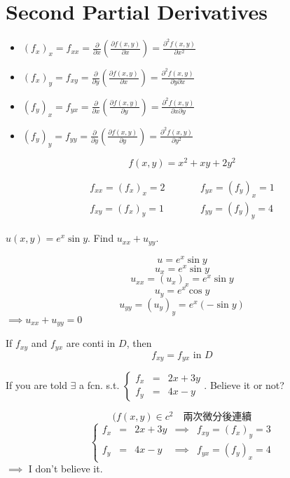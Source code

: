 \section{Second Partial Derivatives}
\begin{itemize}
\item \((f_x)_x = f_{xx} = \displaystyle \frac{\partial}{\partial x} (\frac{\partial f(x, y)}{\partial x}) = \frac{\partial^2 f(x, y)}{\partial x^2}\)
\item \((f_x)_y = f_{xy} = \displaystyle \frac{\partial}{\partial y} (\frac{\partial f(x, y)}{\partial x}) = \frac{\partial^2 f(x, y)}{\partial y \partial x}\)
\item \((f_y)_x = f_{yx} = \displaystyle \frac{\partial}{\partial x} (\frac{\partial f(x, y)}{\partial y}) = \frac{\partial^2 f(x, y)}{\partial x \partial y}\)
\item \((f_y)_y = f_{yy} = \displaystyle \frac{\partial}{\partial y} (\frac{\partial f(x, y)}{\partial y}) = \frac{\partial^2 f(x, y)}{\partial y^2}\)
\end{itemize}
\begin{eg}
\[f(x, y) = x^2 + xy + 2y^2\]

\[\begin{array}{rcl}
f_{xx} = (f_x)_x = 2 & \quad \quad & f_{yx} = (f_y)_x = 1\\
f_{xy} = (f_x)_y = 1 & \quad \quad & f_{yy} = (f_y)_y = 4
\end{array}\]
\end{eg}
\begin{eg}
\(u(x, y) = e^x \sin y\). Find \(u_{xx} + u_{yy}\).

\soln
\[u = e^x \sin y\]
\[u_x = e^x \sin y\]
\[u_{xx} = (u_x)_x = e^x \sin y\]
\[u_y = e^x \cos y\]
\[u_{yy} = (u_y)_y = e^x (- \sin y)\]
\(\implies u_{xx} + u_{yy} = 0\) \quad {}
\end{eg}
\begin{theorem}
If \(f_{xy}\) and \(f_{yx}\) are conti in \(D\), then
\[f_{xy} = f_{yx} \text{ in } D\]
\end{theorem}
\begin{eg}
If you are told \(\exists\) a fcn. s.t. \(\left\{\begin{array}{rcl}
f_x & = & 2x + 3y\\
f_y & = & 4x - y
\end{array}\right.\). Believe it or not?

\soln
\[(f(x, y) \in c^2 \quad \text{兩次微分後連續}\]
\[\left\{\begin{array}{rclcrl}
f_x & = & 2x + 3y &\implies & f_{xy} = (f_x)_y = 3\\
f_y & = & 4x - y & \implies & f_{yx} = (f_y)_x = 4
\end{array}\right.\]
\(\implies\) I don't believe it.
\end{eg}
